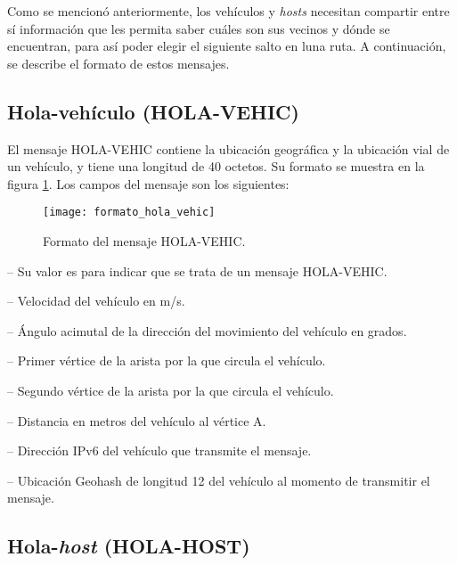 Como se mencionó anteriormente, los vehículos y \textit{hosts} necesitan
compartir entre sí información que les permita saber cuáles son sus vecinos y
dónde se encuentran, para así poder elegir el siguiente salto en luna ruta. A
continuación, se describe el formato de estos mensajes.

\subsection{Hola-vehículo (HOLA-VEHIC)}
\label{subsec:mensaje_hola_vehic}

El mensaje HOLA-VEHIC contiene la ubicación geográfica y la ubicación vial de un
vehículo, y tiene una longitud de 40 octetos. Su formato se muestra en la figura
\ref{fig:formato_hola_vehic}. Los campos del mensaje son los siguientes:

\begin{figure}[th!]
\centering
\texttt{[image: formato\_hola\_vehic]}
\decoRule
\caption[Formato del mensaje HOLA-VEHIC]{Formato del mensaje HOLA-VEHIC.}
\label{fig:formato_hola_vehic}
\end{figure}

 -- Su valor es  para indicar que se trata de un
mensaje HOLA-VEHIC.

 -- Velocidad del vehículo en m/s.

 -- Ángulo acimutal de la dirección del movimiento
del vehículo en grados.

 -- Primer vértice de la arista por la que
circula el vehículo.

 -- Segundo vértice de la arista por la que
circula el vehículo.

 -- Distancia en metros del vehículo al vértice
A.

 -- Dirección IPv6 del vehículo que
transmite el mensaje.

 -- Ubicación Geohash de longitud 12 del
vehículo al momento de transmitir el mensaje.

\subsection{Hola-\textit{host} (HOLA-HOST)}
\label{subsec:mensaje_hola_host}

